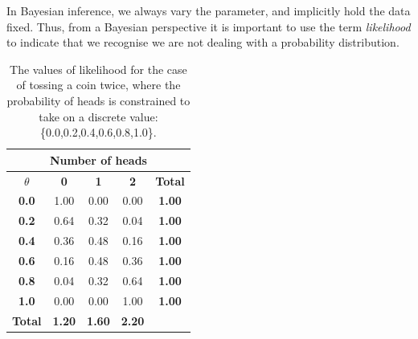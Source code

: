 \documentclass[11pt,fullpage]{book}
\begin{document}
In Bayesian inference, we always vary the parameter, and implicitly hold the data fixed. Thus, from a Bayesian perspective it is important to use the term \textit{likelihood} to indicate that we recognise we are not dealing with a probability distribution.


\begin{table}[htbp]
  \centering
  
    \begin{tabular}{ccccc}
    \multicolumn{5}{c}{\textbf{Number of heads}} \\
    \midrule
    \textbf{$\theta$} & \multicolumn{1}{c}{\textbf{0}} & \multicolumn{1}{c}{\textbf{1}} & \multicolumn{1}{c}{\textbf{2}} &  \multicolumn{1}{c}{\textbf{Total}} \\
    \hline
    \textbf{0.0} & \multicolumn{1}{c}{1.00} & \multicolumn{1}{c}{0.00} & \multicolumn{1}{c}{0.00} & \multicolumn{1}{c}{\textbf{1.00}} \\
    \textbf{0.2} & \multicolumn{1}{c}{0.64} & \multicolumn{1}{c}{0.32} & \multicolumn{1}{c}{0.04} & \multicolumn{1}{c}{\textbf{1.00}} \\
    \textbf{0.4} & \multicolumn{1}{c}{0.36} & \multicolumn{1}{c}{0.48} & \multicolumn{1}{c}{0.16} & \multicolumn{1}{c}{\textbf{1.00}} \\
    \textbf{0.6} & \multicolumn{1}{c}{0.16} & \multicolumn{1}{c}{0.48} & \multicolumn{1}{c}{0.36} & \multicolumn{1}{c}{\textbf{1.00}} \\
    \textbf{0.8} & \multicolumn{1}{c}{0.04} & \multicolumn{1}{c}{0.32} & \multicolumn{1}{c}{0.64} & \multicolumn{1}{c}{\textbf{1.00}} \\
    \textbf{1.0} & \multicolumn{1}{c}{0.00} & \multicolumn{1}{c}{0.00} & \multicolumn{1}{c}{1.00} & \multicolumn{1}{c}{\textbf{1.00}} \\
    \bottomrule
    \textbf{Total} & \multicolumn{1}{c}{\textbf{1.20}} & \multicolumn{1}{c}{\textbf{1.60}} & \multicolumn{1}{c}{\textbf{2.20}} &  \\
    
    \end{tabular}%
  \caption{The values of likelihood for the case of tossing a coin twice, where the probability of heads is constrained to take on a discrete value: \{0.0,0.2,0.4,0.6,0.8,1.0\}.}\label{tab:Likeihood_BayesBox}
\end{table}
\end{document}
